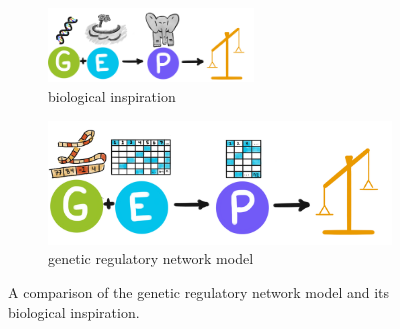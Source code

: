 \begin{figure}
  \centering
  \begin{subfigure}[b]{\textwidth}
    \centering
    \includegraphics[width=0.6\textwidth]{img/bioscheme}
    \caption{biological inspiration}
    \label{subfig:bioscheme}
  \end{subfigure}
  \hfill
  \begin{subfigure}[b]{0.6\textwidth}
    \centering
    \includegraphics[width=\textwidth]{img/modelscheme}
    \caption{genetic regulatory network model}
     \label{subfig:modelscheme}
  \end{subfigure}
  \captionsetup{singlelinecheck=off,justification=raggedright}
  \caption{A comparison of the genetic regulatory network model and its biological inspiration.}
  \label{fig:model_bio_comparison}
\end{figure}